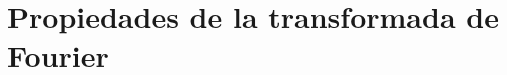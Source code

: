 \begin{comment}
\begin{ejemplo}
Consideremos ahora una función $f(x) \notin L^1$. Sea $f(x) = \sign(x)$  tal que $f(x) \notin L^1$, ya que $\int\limits_{-\infty}^{\infty}  |f(x)| \,dx$ diverge. Intentemos de todas maneras evaluar la transformada de Fourier, teniendo en cuenta que $f$ es real e impar.

\begin{align*}
    \tilde{f}(k) = \frac{1}{2\pi} \int_{-\infty}^{\infty} \sign(x) e^{-ikx} \,dx &= -\frac{i}{\pi} ^*\int_{0}^{\infty} \sin kx \,dx \qquad \mbox{(Integral de Cesàro)} \\
    &= \left\{ \begin{array}{cl}
        \frac{1}{i \pi k},  & k \neq 0  \\
         0, & k = 0
    \end{array} \right. .
\end{align*}

\end{ejemplo}    
\end{comment}

\section{Propiedades de la transformada de Fourier}

